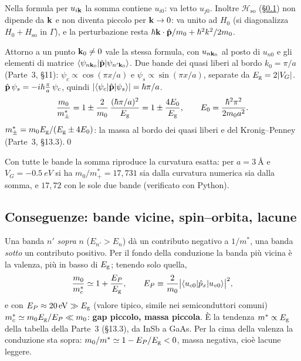 \documentclass[11pt,a4paper]{article}
\begin{document}
\begin{osservazione}[slide 40]
Nella formula per $u_{i\mathbf k}$ la somma contiene $u_{i0}$: va letto $u_{j0}$. Inoltre $\mathcal H_{\mathrm{so}}$ (§\ref{sec:so}) non dipende da $\mathbf k$ e non
diventa piccolo per $\mathbf k\to0$: va unito ad $H_0$ (si diagonalizza $H_0+H_{\mathrm{so}}$ in $\Gamma$), e la perturbazione resta
$\hbar\mathbf k\cdot\hat{\mathbf p}/m_0+\hbar^2k^2/2m_0$.
\end{osservazione}

\begin{dimostrazione}
Attorno a un punto $\mathbf k_0\ne0$ vale la stessa formula, con $u_{n\mathbf k_0}$ al posto di $u_{n0}$ e gli elementi di matrice
$\langle\psi_{n\mathbf k_0}|\hat{\mathbf p}|\psi_{n'\mathbf k_0}\rangle$. Due bande dei quasi liberi al bordo $k_0=\pi/a$ (Parte~3, §11): $\psi_c\propto\cos(\pi x/a)$ e
$\psi_s\propto\sin(\pi x/a)$, separate da $E_{\mathrm g}=2|V_G|$.
$\hat{\mathbf p}\,\psi_s=-i\hbar\frac\pi a\,\psi_c$, quindi $|\langle\psi_c|\hat{\mathbf p}|\psi_s\rangle|=\hbar\pi/a$.
\[
\frac{m_0}{m^*_\pm}=1\pm\frac2{m_0}\,\frac{(\hbar\pi/a)^2}{E_{\mathrm g}}=1\pm\frac{4E_0}{E_{\mathrm g}},\qquad E_0=\frac{\hbar^2\pi^2}{2m_0a^2}.
\]
$m^*_\pm=m_0E_{\mathrm g}/(E_{\mathrm g}\pm4E_0)$: la massa al bordo dei quasi liberi e del Kronig--Penney (Parte~3, §13.3).\qed
\end{dimostrazione}
Con tutte le bande la somma riproduce la curvatura esatta: per $a=\SI{3}{\angstrom}$ e $V_G=\SI{-0.5}{eV}$ si ha $m_0/m^*_+=17{,}731$ sia dalla
curvatura numerica sia dalla somma, e $17{,}72$ con le sole due bande (verificato con Python).

\subsection{Conseguenze: bande vicine, spin--orbita, lacune}\label{sec:so}
Una banda $n'$ \emph{sopra} $n$ ($E_{n'}>E_n$) dà un contributo negativo a $1/m^*$, una banda \emph{sotto} un contributo positivo. Per il fondo della
conduzione la banda più vicina è la valenza, più in basso di $E_{\mathrm g}$; tenendo solo quella,
\[
\frac{m_0}{m^*_c}\simeq1+\frac{E_P}{E_{\mathrm g}},\qquad E_P\equiv\frac2{m_0}\bigl|\langle u_{c0}|\hat p_x|u_{v0}\rangle\bigr|^2 ,
\]
e con $E_P\approx\SI{20}{eV}\gg E_{\mathrm g}$ (valore tipico, simile nei semiconduttori comuni) $m^*_c\simeq m_0E_{\mathrm g}/E_P\ll m_0$: \textbf{gap piccolo, massa
piccola}. È la tendenza $m^*\propto E_{\mathrm g}$ della tabella della Parte~3 (§13.3), da InSb a GaAs. Per la cima della valenza la conduzione sta sopra:
$m_0/m^*\simeq1-E_P/E_{\mathrm g}<0$, massa negativa, cioè lacune leggere.
\end{document}
